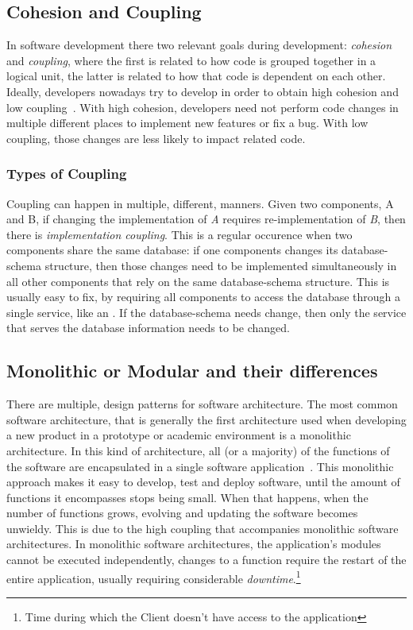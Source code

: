 \subsection{Cohesion and Coupling}\label{state-of-the-art:ss:cohesion-and-coupling}
In software development there two relevant goals during development: \textit{cohesion} and \textit{coupling}, where the first is related to how code is grouped together in a logical unit, the latter is related to how that code is dependent on each other. Ideally, developers nowadays try to develop in order to obtain high cohesion and low coupling~\Parencite{candela_bavota_russo_oliveto_2016}. With high cohesion, developers need not perform code changes in multiple different places to implement new features or fix a bug. With low coupling, those changes are less likely to impact related code.

\subsubsection{Types of Coupling}\label{state-of-the-art:ss:types-of-coupling}


Coupling can happen in multiple, different, manners. Given two components, A and B, if changing the implementation of \textit{A} requires re-implementation of \textit{B}, then there is \textit{implementation coupling}. This is a regular occurence when two components share the same database: if one components changes its database-schema structure, then those changes need to be implemented simultaneously in all other components that rely on the same database-schema structure. This is usually easy to fix, by requiring all components to access the database through a single service, like an . If the database-schema needs change, then only the service that serves the database information needs to be changed.


\subsection{Monolithic or Modular and their differences}\label{state-of-the-art:ss:monolithic-or-modular-and-their-differences}

There are multiple, design patterns for software architecture. The most common software architecture, that is generally the first architecture used when developing a new product in a prototype or academic environment is a monolithic architecture. In this kind of architecture, all (or a majority) of the functions of the software are encapsulated in a single software application~\Parencite{chen_li_li_2017}. This monolithic approach makes it easy to develop, test and deploy software, until the amount of functions it encompasses stops being small. When that happens, when the number of functions grows, evolving and updating the software becomes unwieldy. This is due to the high coupling that accompanies monolithic software architectures. In monolithic software architectures, the application's modules cannot be executed independently, changes to a function require the restart of the entire application, usually requiring considerable \textit{downtime}.\footnote{\label{foot:downtime}Time during which the Client doesn't have access to the application}

